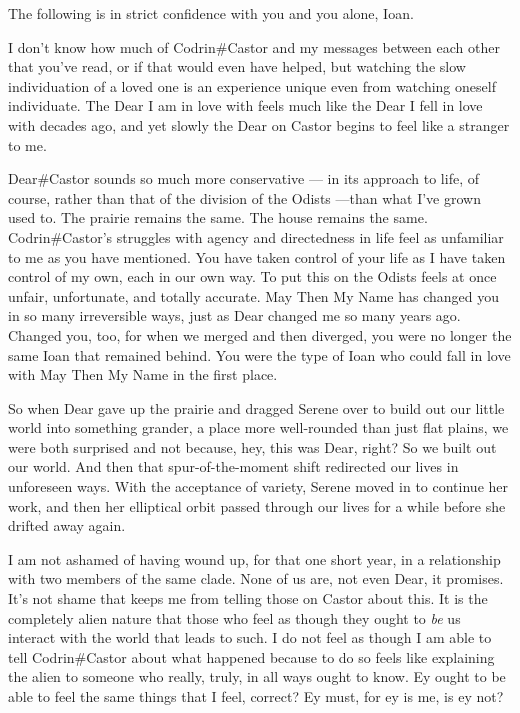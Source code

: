 The following is in strict confidence with you and you alone, Ioan.

I don't know how much of Codrin\#Castor and my messages between each other that you've read, or if that would even have helped, but watching the slow individuation of a loved one is an experience unique even from watching oneself individuate. The Dear I am in love with feels much like the Dear I fell in love with decades ago, and yet slowly the Dear on Castor begins to feel like a stranger to me.

Dear\#Castor sounds so much more conservative — in its approach to life, of course, rather than that of the division of the Odists —than what I've grown used to. The prairie remains the same. The house remains the same. Codrin\#Castor's struggles with agency and directedness in life feel as unfamiliar to me as you have mentioned. You have taken control of your life as I have taken control of my own, each in our own way. To put this on the Odists feels at once unfair, unfortunate, and totally accurate. May Then My Name has changed you in so many irreversible ways, just as Dear changed me so many years ago. Changed you, too, for when we merged and then diverged, you were no longer the same Ioan that remained behind. You were the type of Ioan who could fall in love with May Then My Name in the first place.

So when Dear gave up the prairie and dragged Serene over to build out our little world into something grander, a place more well-rounded than just flat plains, we were both surprised and not because, hey, this was Dear, right? So we built out our world. And then that spur-of-the-moment shift redirected our lives in unforeseen ways. With the acceptance of variety, Serene moved in to continue her work, and then her elliptical orbit passed through our lives for a while before she drifted away again.

I am not ashamed of having wound up, for that one short year, in a relationship with two members of the same clade. None of us are, not even Dear, it promises. It's not shame that keeps me from telling those on Castor about this. It is the completely alien nature that those who feel as though they ought to \emph{be} us interact with the world that leads to such. I do not feel as though I am able to tell Codrin\#Castor about what happened because to do so feels like explaining the alien to someone who really, truly, in all ways ought to know. Ey ought to be able to feel the same things that I feel, correct? Ey must, for ey is me, is ey not?

